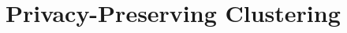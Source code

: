 %

\chapter{Privacy-Preserving Clustering}
\label{chapter:kmeans}







%

\begin{comment}

 

\appendix

\end{comment}
\begin{comment}



\end{comment}

